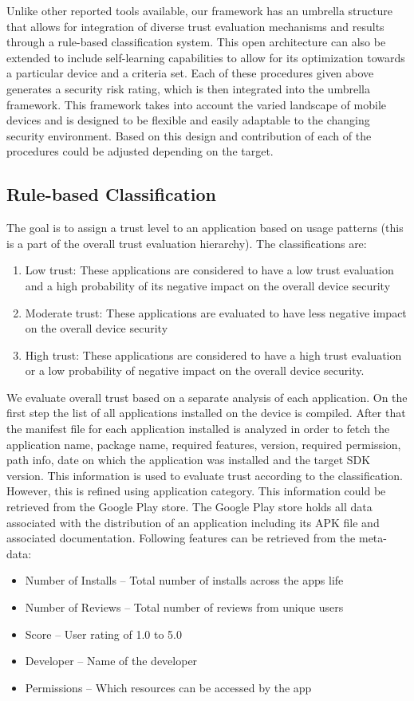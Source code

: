 Unlike other reported tools available, our framework has an umbrella structure that allows for integration of 
diverse trust evaluation mechanisms and results through a rule-based classification system.
This open architecture can also be extended to include 
 self-learning capabilities to allow for its optimization towards a particular device and a criteria set. Each of these procedures given above generates a security risk rating, which is then integrated into the umbrella framework. This framework takes into account the varied landscape of mobile devices and is designed to be flexible and easily adaptable to the changing security environment. Based on this design and contribution of each of the procedures could be adjusted depending on the target.

\subsection{Rule-based Classification}
The goal is to assign a trust level to an application based on usage patterns (this is a part of the
overall trust evaluation hierarchy).
The classifications are: 
\begin{enumerate}
  \item Low trust: These applications are considered to have
a low trust evaluation and a high probability of its negative
impact on the overall device security
  \item Moderate trust: These applications are evaluated to have
less negative  impact on the overall device security
  \item High trust: These applications are considered to have a high
trust evaluation or a low probability of  negative impact
on the overall device security.
\end{enumerate}

We evaluate overall trust based on a separate
analysis of each application. On the first step the list of all
applications installed on the device is compiled. After that the
manifest file for each application installed is analyzed in order to
fetch the application name, package name, required features,
version, required permission, path info, date on which the
application was installed and the target SDK version. This
information is used to evaluate  trust according to the classification.
However, this is refined using
application category. This information could
be retrieved from the Google Play store. The Google Play store
holds all data associated with the distribution of an application
including its APK file and associated documentation.  Following
features can be retrieved from the
meta-data:
\begin{itemize}
  \item Number of Installs – Total number of installs across the apps life
  \item Number of Reviews – Total number of reviews from unique users
  \item Score – User rating of 1.0 to 5.0
  \item Developer – Name of the developer
  \item Permissions – Which resources can be accessed by the app
\end{itemize}

